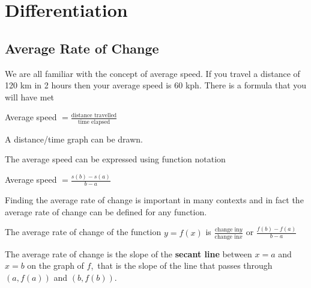 \chapter{Differentiation}


\section{Average Rate of Change}
We are all familiar with the concept of average speed. If you travel a distance of 120 km in 2 hours
then your average speed is 60 kph. There is a formula that you will have met 


\begin{center}
Average speed $ =\frac{\text{distance travelled}}{\text{time elapsed}}$
\end{center}\par
A distance/time graph can be drawn. 

The average speed can be expressed using
function notation 


\begin{center}
Average speed $ =\frac{s (b) -s (a)}{b -a}$
\end{center}\par
Finding the average rate of change is important in many contexts and in fact the average rate
of change can be defined for any function. 

The average rate of change of the function $y =f (x)$ is $\frac{\text{change in}y}{\text{change in}x}$ or $\frac{f (b) -f (a)}{b -a}$ 

The average rate of change is the slope of the \textbf{secant line} between $x =a$ and $x =b$ on the graph of $f$,\ that is the slope of the line that passes through $(a ,f (a))$ and $(b ,f (b))$. 

